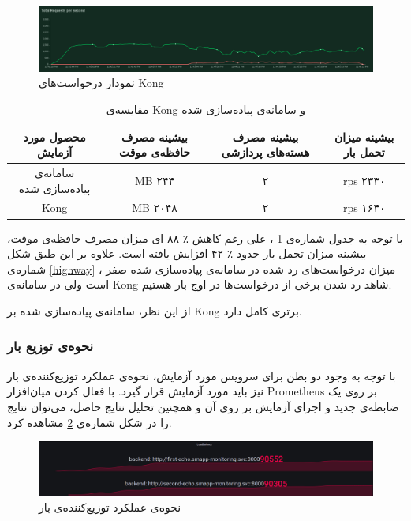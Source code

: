 \begin{figure}[H]
    \centering
    \caption{نمودار درخواست‌های Kong}
    \label{kong}
    \includegraphics[scale=0.25]{images/KongStats.png}
\end{figure}

\begin{table}[H]
    \centering
    \caption{مقایسه‌ی Kong و سامانه‌ی پیاده‌سازی شده}\label{tab:kongvshighway}
    \begin{tabular}{|c|c|c|c|}
        \hline
        محصول مورد آزمایش & بیشینه مصرف حافظه‌ی موقت & بیشینه مصرف هسته‌های پردازشی & بیشینه میزان تحمل بار\\
        \hline
        سامانه‌ی پیاده‌سازی شده & MB ۲۴۴  & ۲ & rps ۲۳۳۰ \\
        \hline
        Kong & MB ۲۰۴۸ & ۲ & rps ۱۶۴۰ \\
        \hline
    \end{tabular}
\end{table}

با توجه به جدول شماره‌ی
\ref{tab:kongvshighway}
، علی رغم کاهش ٪ ۸۸ ای میزان مصرف حافظه‌ی موقت، بیشینه میزان تحمل بار حدود ٪ ۴۲ افزایش یافته است. علاوه بر این طبق شکل شماره‌ی
\ref{highway}
، میزان درخواست‌های رد شده در سامانه‌ی پیاده‌سازی شده صفر است ولی در سامانه‌ی Kong شاهد رد شدن برخی از درخواست‌ها در اوج بار هستیم.

از این نظر، سامانه‌ی پیاده‌سازی شده بر Kong برتری کامل دارد.

\subsubsection{نحوه‌ی توزیع بار}
با توجه به وجود دو بطن برای سرویس مورد آزمایش، نحوه‌ی عملکرد توزیع‌کننده‌ی بار نیز باید مورد آزمایش قرار گیرد. با فعال کردن میان‌افزار Prometheus بر روی یک ضابطه‌ی جدید و اجرای آزمایش بر روی آن و همچنین تحلیل نتایج حاصل، می‌توان نتایج را در شکل شماره‌ی
\ref{load}
مشاهده کرد.

\begin{figure}[H]
    \centering
    \caption{نحوه‌ی عملکرد توزیع‌کننده‌ی بار}
    \label{load}
    \includegraphics[scale=0.23]{images/LoadBalanceStats.png}
\end{figure}

